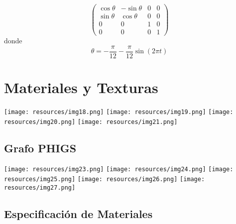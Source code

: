 \documentclass[10pt, a4paper]{article}
\begin{document}
\begin{enumerate}
	\begin{equation*}
		\begin{pmatrix}
			\cos \theta & - \sin \theta & 0 & 0 \\
			\sin \theta & \cos \theta  & 0 & 0 \\
			0 & 0 & 1 & 0 \\
			0 & 0 & 0 & 1
		\end{pmatrix}
	\end{equation*}
	donde
	\begin{equation*}
		\theta = -\frac{\pi}{12} - \frac{\pi}{12}\sin(2 \pi t)
	\end{equation*}
\end{enumerate}

\section{Materiales y Texturas}

\begin{center}
	\texttt{[image: resources/img18.png]}
	\texttt{[image: resources/img19.png]}
	\newpage
	\texttt{[image: resources/img20.png]}
	\texttt{[image: resources/img21.png]}
\end{center}

\newpage

\subsection{Grafo PHIGS}

\begin{center}
	\texttt{[image: resources/img23.png]}
	\newpage
	\texttt{[image: resources/img24.png]}
	\newpage
	\texttt{[image: resources/img25.png]}
	\newpage
	\texttt{[image: resources/img26.png]}
	\newpage
	\texttt{[image: resources/img27.png]}
\end{center}
\newpage

\subsection{Especificación de Materiales}
\end{document}

